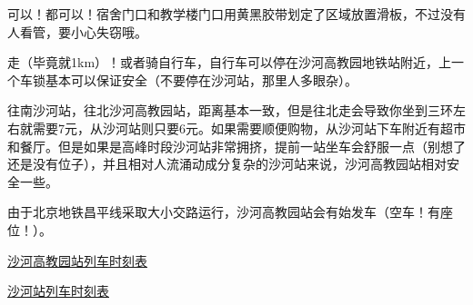 
可以！都可以！宿舍门口和教学楼门口用黄黑胶带划定了区域放置滑板，不过没有人看管，要小心失窃哦。


走（毕竟就1km）！或者骑自行车，自行车可以停在沙河高教园地铁站附近，上一个车锁基本可以保证安全（不要停在沙河站，那里人多眼杂）。


往南沙河站，往北沙河高教园站，距离基本一致，但是往北走会导致你坐到三环左右就需要7元，从沙河站则只要6元。如果需要顺便购物，从沙河站下车附近有超市和餐厅。但是如果是高峰时段沙河站非常拥挤，提前一站坐车会舒服一点（别想了还是没有位子），并且相对人流涌动成分复杂的沙河站来说，沙河高教园站相对安全一些。

由于北京地铁昌平线采取大小交路运行，沙河高教园站会有始发车（空车！有座位！）。

\href{https://www.bjsubway.com/station/xltcx/linecp/2013-08-26/246.html?sk=1}{沙河高教园站列车时刻表}

\href{https://www.bjsubway.com/station/xltcx/linecp/2013-08-26/249.html?sk=1}{沙河站列车时刻表}
